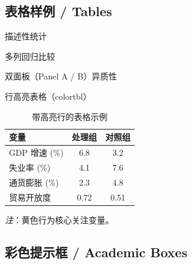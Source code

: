 \subsection{表格样例 / Tables}

\begin{frame}{描述性统计}
  
\end{frame}

\begin{frame}{多列回归比较}
  
\end{frame}

\begin{frame}[shrink=20]{双面板（Panel A / B）异质性}
  
\end{frame}

\begin{frame}{行高亮表格（colortbl）}
  \begin{table}
    \centering
    \caption{带高亮行的表格示例}
    \begin{tabular}{lcc}
      \toprule
      变量 & 处理组 & 对照组 \\
      \midrule
      \rowcolor{yellow!30}
      GDP 增速 (\%) & 6.8 & 3.2 \\
      失业率 (\%)   & 4.1 & 7.6 \\
      \rowcolor{yellow!30}
      通货膨胀 (\%) & 2.3 & 4.8 \\
      贸易开放度    & 0.72 & 0.51 \\
      \bottomrule
    \end{tabular}
  \end{table}
  {\footnotesize \textit{注}：黄色行为核心关注变量。}
\end{frame}

\subsection{彩色提示框 / Academic Boxes}

